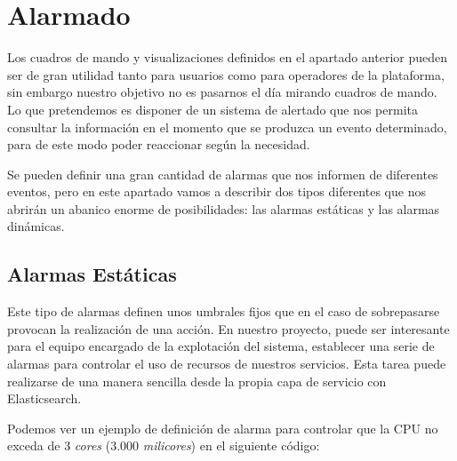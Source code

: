 \section{Alarmado}
Los cuadros de mando y visualizaciones definidos en el apartado anterior pueden ser de gran utilidad tanto para usuarios como para operadores de la plataforma, sin embargo nuestro objetivo no es pasarnos el día mirando cuadros de mando. Lo que pretendemos es disponer de un sistema de alertado que nos permita consultar la información en el momento que se produzca un evento determinado, para de este modo poder reaccionar según la necesidad. 

Se pueden definir una gran cantidad de alarmas que nos informen de diferentes eventos, pero en este apartado vamos a describir dos tipos diferentes que nos abrirán un abanico enorme de posibilidades: las alarmas estáticas y las alarmas dinámicas.

\subsection{Alarmas Estáticas}
Este tipo de alarmas definen unos umbrales fijos que en el caso de sobrepasarse provocan la realización de una acción. En nuestro proyecto, puede ser interesante para el equipo encargado de la explotación del sistema, establecer una serie de alarmas para controlar el uso de recursos de nuestros servicios. Esta tarea puede realizarse de una manera sencilla desde la propia capa de servicio con Elasticsearch.

Podemos ver un ejemplo de definición de alarma para controlar que la CPU no exceda de 3 \textit{cores} (3.000 \textit{milicores})  en el siguiente código: 


